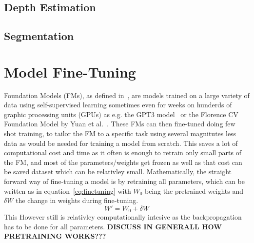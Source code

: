 \subsection{Depth Estimation}
\subsection{Segmentation}

\section{Model Fine-Tuning}
Foundation Models (FMs), as defined in~\cite{Bommasani2021}, are models trained on a large variety of data using self-supervised learning sometimes even for weeks on hunderds of graphic processing units (GPUs) as e.g. the GPT3 model~\cite{Yuan2022} or the Florence CV Foundation Model by Yuan et al.~\cite{Yuan2021}.
These FMs can then fine-tuned doing few shot training, to tailor the FM to a specific task using several magnitutes less data as would be needed for training a model from scratch.
This saves a lot of computational cost and time as it often is enough to retrain only small parts of the FM, and most of the parameters/weights get frozen as well as that cost can be saved dataset which can be relativley small.
Mathematically, the straight forward way of fine-tuning a model is by retraining all parameters, which can be written as in equation~\ref{eq:finetuning} with $W_0$ being the pretrained weights and $\delta W$ the change in weights during fine-tuning.
\begin{equation}
    W' = W_0 + \delta W
    \label{eq:finetuning}
\end{equation}
This However still is relativley computationally intesive as the backpropagation has to be done for all parameters.
\textbf{DISCUSS IN GENERALL HOW PRETRAINING WORKS???}

